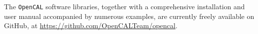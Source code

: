 The \texttt{OpenCAL} software libraries, together with a comprehensive
installation and user manual accompanied by numerous examples, are
currently freely available on GitHub, at \url{https://github.com/OpenCALTeam/opencal}.








